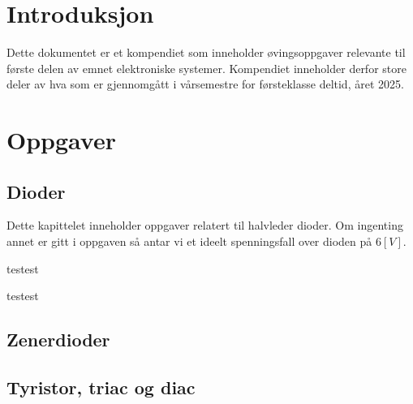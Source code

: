 \documentclass[12pt]{report}
\begin{document}


\tableofcontents
\newpage


\chapter{Introduksjon}
Dette dokumentet er et kompendiet som inneholder øvingsoppgaver relevante til første delen av emnet elektroniske systemer. Kompendiet inneholder derfor store deler av hva som er gjennomgått i vårsemestre for førsteklasse deltid, året 2025.


\chapter{Oppgaver}


\section{Dioder}





Dette kapittelet inneholder oppgaver relatert til halvleder dioder. Om ingenting annet er gitt i oppgaven så antar vi et ideelt spenningsfall over dioden på $6[V]$.\\


\printsolutions[section]


\begin{question}[name=Spørsmål, subtitle=The subtitle of the question]
testest
\end{question}

\begin{question}[name=Spørsmål, subtitle=The subtitle of the question]
testest
\end{question}

\newpage

\section{Zenerdioder}
%
\printsolutions[section]


\section{Tyristor, triac og diac}
\end{document}
